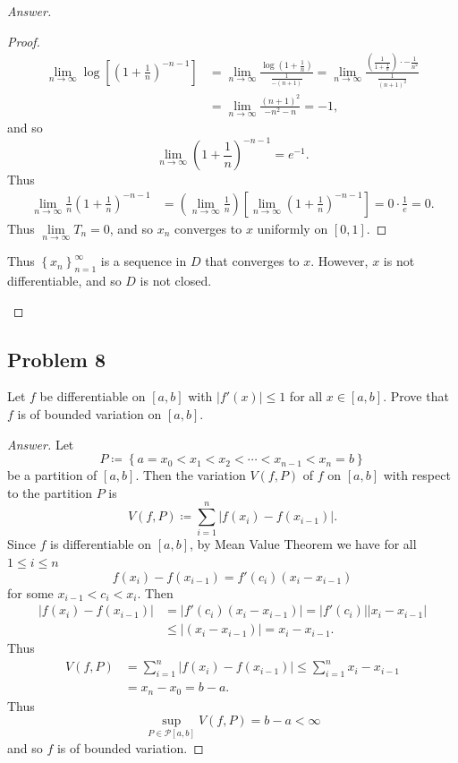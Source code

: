 \documentclass[12pt]{article}
\newcommand\paren[1]{\left( #1 \right)}
\newcommand\setb[1]{\left \{ #1 \right \}}
\newcommand{\sqbrack}[1]{\left [ #1 \right ]}
\theoremstyle{definition}
\begin{document}
\begin{proof}[Answer]
\begin{enumerate}[(a)]
\begin{proof}
\begin{align*}
                \lim\limits_{n \to \infty} \log \sqbrack{ \paren{ 1 + \frac{1}{n} }^{-n-1} } & = \lim\limits_{ n \to \infty } \frac{ \log \paren{ 1 + \frac{1}{n} } }{ \frac{1}{-(n+1)} } = \lim\limits_{ n \to \infty } \frac{ \paren{ \frac{1}{ 1 + \frac{1}{n} } } \cdot -\frac{1}{n^2} }{ \frac{1}{(n+1)^2} } \\
                & = \lim\limits_{ n \to \infty } \frac{ (n+1)^2 }{ -n^2 - n } = -1,
            \end{align*}
            and so 
            \[
                \lim\limits_{n \to \infty} \paren{ 1 + \frac{1}{n} }^{-n-1} = e^{-1}.
            \]
            Thus 
            \begin{align*}
                \lim\limits_{n \to \infty} \frac{1}{n} \paren{ 1 + \frac{1}{n} }^{-n-1} & = \paren{ \lim\limits_{n \to \infty} \frac{1}{n} } \sqbrack{ \lim\limits_{n \to \infty} \paren{ 1 + \frac{1}{n} }^{-n-1} } = 0 \cdot \frac{1}{e} = 0.
            \end{align*}
            Thus $\lim\limits_{n \to \infty} T_n = 0$, and so $x_n$ converges to $x$ uniformly on $[0,1]$.
        \end{proof}
        Thus $\setb{ x_n }_{n = 1}^{\infty}$ is a sequence in $D$ that converges to $x$. However, $x$ is not differentiable, and so $D$ is not closed.
    \end{enumerate}
\end{proof}
\subsection{Problem 8}
Let $f$ be differentiable on $[a,b]$ with $|f'(x)| \leq 1$ for all $x \in [a,b]$. Prove that $f$ is of bounded variation on $[a,b]$.
\begin{proof}[Answer]
    Let 
    \[
        P \coloneqq \setb{ a = x_0 < x_1 < x_2 < \dotsb < x_{n-1} < x_n = b }
    \]
    be a partition of $[a,b]$. Then the variation $V(f,P)$ of $f$ on $[a,b]$ with respect to the partition $P$ is 
    \[
        V(f,P) \coloneqq \sum\limits_{i = 1}^n \left| f(x_i) - f(x_{i-1}) \right|.
    \]
    Since $f$ is differentiable on $[a,b]$, by Mean Value Theorem we have for all $1 \leq i \leq n$ 
    \[
        f \paren{ x_i } - f \paren{ x_{i-1} } = f' \paren{ c_i } \paren{ x_i - x_{i-1} }
    \]
    for some $x_{i-1} < c_i < x_i$. Then 
    \begin{align*}
        \left| f \paren{ x_i } - f \paren{ x_{i-1} } \right| & = \left| f' \paren{ c_i } \paren{ x_i - x_{i-1} } \right| = \left| f' \paren{ c_i } \right| \left|  x_i - x_{i-1} \right| \\
        & \leq \left| \paren{ x_i - x_{i-1} } \right| = x_i - x_{i-1}.
    \end{align*}
    Thus 
    \begin{align*}
        V(f,P) & = \sum\limits_{i = 1}^n \left| f(x_i) - f(x_{i-1}) \right| \leq \sum\limits_{i = 1}^n x_i - x_{i-1} \\
        & = x_n - x_0 = b - a.
    \end{align*}
    Thus 
    \[
        \sup\limits_{P \in \mathscr{P}[a,b]} V(f,P) = b - a < \infty
    \]
    and so $f$ is of bounded variation.
\end{proof}
\newpage
\end{document}
